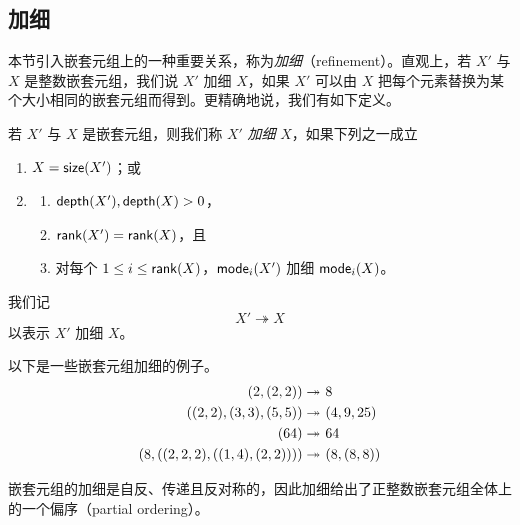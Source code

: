 \subsection{加细}\label{refinementsection}

本节引入嵌套元组上的一种重要关系，称为{\it 加细}（refinement）。直观上，若 $X'$ 与 $X$ 是整数嵌套元组，我们说 $X'$ 加细 $X$，如果 $X'$ 可以由 $X$ 把每个元素替换为某个大小相同的嵌套元组而得到。更精确地说，我们有如下定义。

\begin{definition}\label{definitionofrefinement}
若 $X'$ 与 $X$ 是嵌套元组，则我们称 $X'$ {\it 加细} $X$，如果下列之一成立
    \begin{enumerate}
    \item $X = \mathsf{size}(X')$；或
    \item
    \begin{enumerate}
    \item $\mathsf{depth}(X'),\mathsf{depth}(X) > 0$，
    \item $\mathsf{rank}(X') = \mathsf{rank}(X)$，且
    \item 对每个 $1 \leq i \leq \mathsf{rank}(X)$，$\mathsf{mode}_i(X')$ 加细 $\mathsf{mode}_i(X)$。
    \end{enumerate}
    \end{enumerate}
\end{definition}

\begin{notation}
我们记
\[X' \twoheadrightarrow X\]
以表示 $X'$ 加细 $X$。
\end{notation}

\begin{example}
    以下是一些嵌套元组加细的例子。
    \[\begin{aligned}
        (2,(2,2))\twoheadrightarrow &  \hspace{0.05in} 8\\
        ((2,2),(3,3),(5,5)) \twoheadrightarrow & \hspace{0.05in} (4,9,25)\\
        (64) \twoheadrightarrow & \hspace{0.05in} 64\\
        (8,((2,2,2),((1,4),(2,2)))) \twoheadrightarrow & \hspace{0.05in} (8,(8,8))
    \end{aligned}\]
\end{example}


\begin{observation}
嵌套元组的加细是自反、传递且反对称的，因此加细给出了正整数嵌套元组全体上的一个偏序（partial ordering）。
\end{observation}


